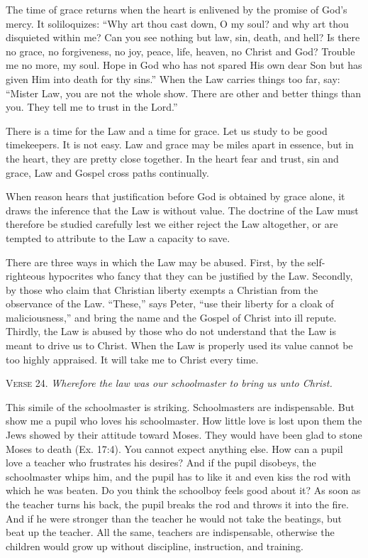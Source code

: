 The time of grace returns when the heart is enlivened by the promise of God’s mercy. It soliloquizes: “Why art thou cast down, O my soul? and why art thou disquieted within me? Can you see nothing but law, sin, death, and hell? Is there no grace, no forgiveness, no joy, peace, life, heaven, no Christ and God? Trouble me no more, my soul. Hope in God who has not spared His own dear Son but has given Him into death for thy sins.” When the Law carries things too far, say: “Mister Law, you are not the whole show. There are other and better things than you. They tell me to trust in the Lord.”

There is a time for the Law and a time for grace. Let us study to be good timekeepers. It is not easy. Law and grace may be miles apart in essence, but in the heart, they are pretty close together. In the heart fear and trust, sin and grace, Law and Gospel cross paths continually.

When reason hears that justification before God is obtained by grace alone, it draws the inference that the Law is without value. The doctrine of the Law must therefore be studied carefully lest we either reject the Law altogether, or are tempted to attribute to the Law a capacity to save.

There are three ways in which the Law may be abused. First, by the self-righteous hypocrites who fancy that they can be justified by the Law. Secondly, by those who claim that Christian liberty exempts a Christian from the observance of the Law. “These,” says Peter, “use their liberty for a cloak of maliciousness,” and bring the name and the Gospel of Christ into ill repute. Thirdly, the Law is abused by those who do not understand that the Law is meant to drive us to Christ. When the Law is properly used its value cannot be too highly appraised. It will take me to Christ every time.

\textsc{Verse} 24. \emph{Wherefore the law was our schoolmaster to bring us unto Christ.}

This simile of the schoolmaster is striking. Schoolmasters are indispensable. But show me a pupil who loves his schoolmaster. How little love is lost upon them the Jews showed by their attitude toward Moses. They would have been glad to stone Moses to death (Ex. 17:4). You cannot expect anything else. How can a pupil love a teacher who frustrates his desires? And if the pupil disobeys, the schoolmaster whips him, and the pupil has to like it and even kiss the rod with which he was beaten. Do you think the schoolboy feels good about it? As soon as the teacher turns his back, the pupil breaks the rod and throws it into the fire. And if he were stronger than the teacher he would not take the beatings, but beat up the teacher. All the same, teachers are indispensable, otherwise the children would grow up without discipline, instruction, and training.

